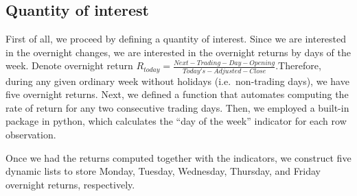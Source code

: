 \documentclass[letterpaper,10pt,english]{/Users/edwsurewin/anaconda/lib/python2.7/site-packages/sphinx/texinputs/sphinxhowto}
\begin{document}
        
    
\subsection{Quantity of interest}\label{quantity-of-interest}

First of all, we proceed by defining a quantity of interest. Since we
are interested in the overnight changes, we are interested in the
overnight returns by days of the week. Denote overnight return
$R_{today}= \frac{Next-Trading-Day-Opening}{Today's-Adjusted-Close}$.Therefore, during any given ordinary week without holidays
(i.e.~non-trading days), we have five overnight returns. Next, we
defined a function that automates computing the rate of return for any
two consecutive trading days. Then, we employed a built-in package in
python, which calculates the ``day of the week'' indicator for each row
observation.

Once we had the returns computed together with the indicators, we
construct five dynamic lists to store Monday, Tuesday, Wednesday,
Thursday, and Friday overnight returns, respectively.

\end{document}
